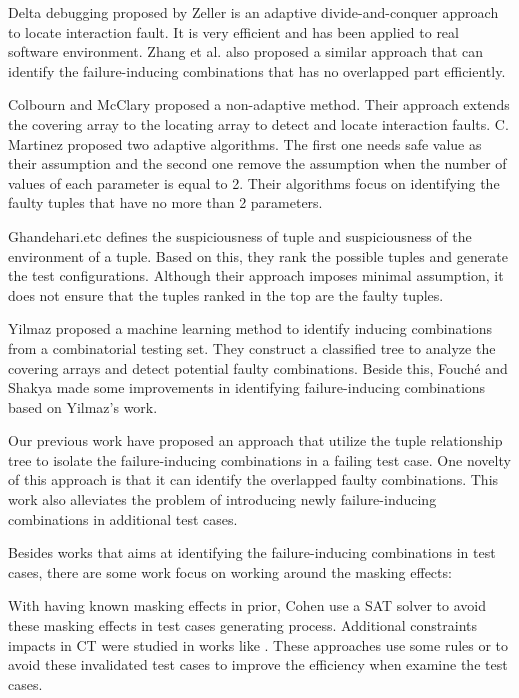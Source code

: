 \documentclass{sig-alternate}
\begin{document}
Delta debugging \cite{zeller2002simplifying} proposed by Zeller is an adaptive divide-and-conquer approach to locate interaction fault. It is very efficient and has been applied to real software environment. Zhang et al. \cite{zhang2011characterizing} also proposed a similar approach that can identify the failure-inducing combinations that has no overlapped part efficiently.

Colbourn and McClary \cite{colbourn2008locating} proposed a non-adaptive method. Their approach extends the covering array to the locating array to detect and locate interaction faults. C. Martinez \cite{martinez2008algorithms,martinez2009locating} proposed two adaptive algorithms. The first one needs safe value as their assumption and the second one remove the assumption when the number of values of each parameter is equal to 2. Their algorithms focus on identifying the faulty tuples that have no more than 2 parameters.  

Ghandehari.etc \cite{ghandehari2012identifying} defines the suspiciousness of tuple and suspiciousness of the environment of a tuple. Based on this, they rank the possible tuples and generate the test configurations. Although their approach imposes minimal assumption, it does not ensure that the tuples ranked in the top are the faulty tuples.

Yilmaz \cite{yilmaz2006covering} proposed a machine learning method to identify inducing combinations from a combinatorial testing set. They construct a classified tree to analyze the covering arrays and detect potential faulty combinations. Beside this, Fouché \cite{fouche2009incremental} and Shakya \cite{shakya2012isolating} made some improvements in identifying failure-inducing combinations based on Yilmaz's work.

Our previous work \cite{niu2013identifying} have proposed an approach that utilize the tuple relationship tree to isolate the failure-inducing combinations in a failing test case. One novelty of this approach is that it can identify the overlapped faulty combinations. This work also alleviates the problem of introducing newly failure-inducing combinations in additional test cases.

Besides works that aims at identifying the failure-inducing combinations in test cases, there are some work focus on working around the masking effects:

With having known masking effects in prior, Cohen \cite{cohen2008constructing} use a SAT solver to avoid these masking effects in test cases generating process. Additional constraints impacts in CT were studied in works like \cite{bryce2006prioritized,chen2010combinatorial,calvagna2008logic,grindal2006handling,yilmaz2013test}. These approaches use some rules or to avoid these invalidated test cases to improve the efficiency when examine the test cases. 
\end{document}
